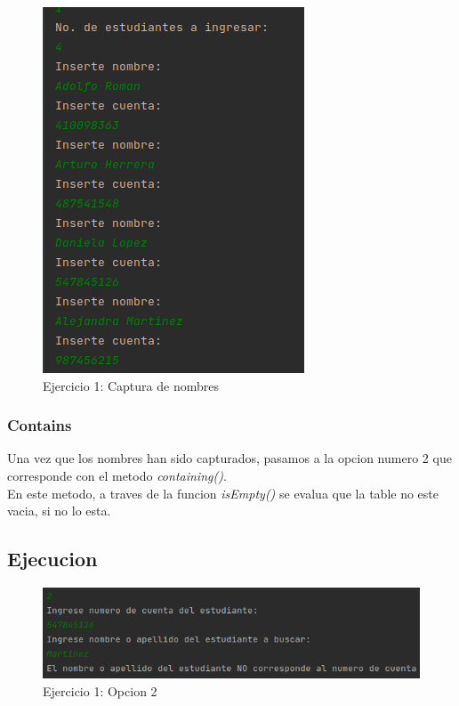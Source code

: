 \documentclass{article}
\begin{document}
				\begin{figure}[H]
					\centering
					\includegraphics[scale=0.8]{images/e12.png}
					\caption*{Ejercicio 1: Captura de nombres}
				\end{figure}
			
			\subsubsection{Contains}
			
				Una vez que los nombres han sido capturados, pasamos a la opcion numero 2 que corresponde con el metodo \emph{containing()}.\\
				
				En este metodo, a traves de la funcion \emph{isEmpty()} se evalua que la table no este vacia, si no lo esta.		
	
		
		\subsection{Ejecucion}
			
			
			\begin{figure}[H]
				\centering
				\includegraphics[scale=0.6]{images/e13.png}
				\caption*{Ejercicio 1: Opcion 2}
			\end{figure}
			
\end{document}
